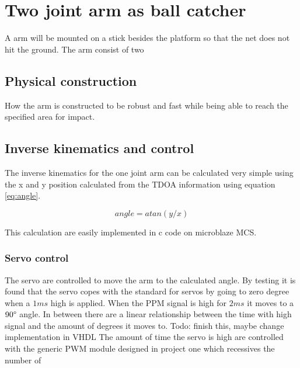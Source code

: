 \chapter{Two joint arm as ball catcher}
\label{catcherArm}
A arm will be mounted on a stick besides the platform so that the net does not hit the ground. The arm consist of two

\section{Physical construction}
\label{armConstruction}
How the arm is constructed to be robust and fast while being able to reach the specified area for impact.

\section{Inverse kinematics and control }
\label{kinematics}
The inverse kinematics for the one joint arm can be calculated very simple using the x and y position calculated from the TDOA information using equation \ref{eq:angle}.

\begin{equation}
	angle = atan(y/x)
	\label{eq:angle}
\end{equation}

This calculation are easily implemented in c code on microblaze MCS. 

\subsection{Servo control}
The servo are controlled to move the arm to the calculated angle. By testing it is found that the servo copes with the standard for servos by going to zero degree when a $1\si{ms}$ high is applied. When the PPM signal is high for $2\si{ms}$ it moves to a $90\degree$ angle. In between there are a linear relationship between the time with high signal and the amount of degrees it moves to.
Todo: finish this, maybe change implementation in VHDL
The amount of time the servo is high are controlled with the generic PWM module designed in project one which recessives the number of   


